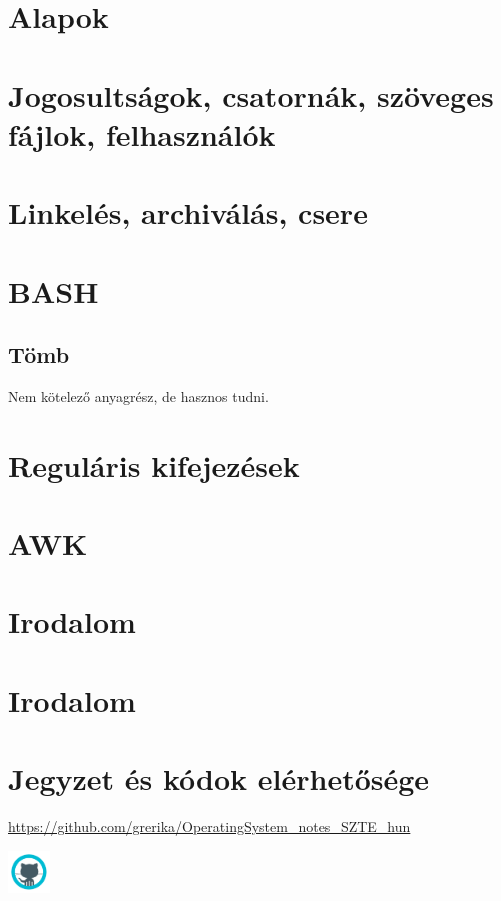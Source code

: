 \documentclass[a4paper]{article}
\begin{document}
\pagebreak
\tableofcontents

\cleardoublepage



%	

\section{Alapok}

	

\section{Jogosultságok, csatornák, szöveges fájlok, felhasználók}
	

\section{Linkelés, archiválás, csere}
	
	
\section{BASH}
	
	
	\subsection{Tömb}
	Nem kötelező anyagrész, de hasznos tudni.
		


\section{Reguláris kifejezések}
	
	
\section{AWK}
	
	


\section{Irodalom}
    


\section{Irodalom}
    


\section*{Jegyzet és kódok elérhetősége}
\begin{center}
\url{https://github.com/grerika/OperatingSystem_notes_SZTE_hun}

\includegraphics[width=3em]{pics/icons8-github}
\end{center}
\end{document}
